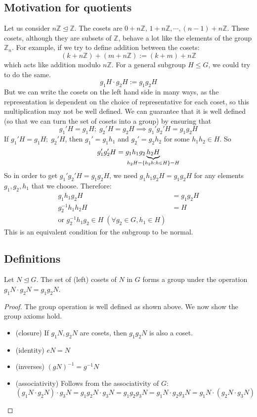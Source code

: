 \subsection{Motivation for quotients}
Let us consider \(n\mathbb Z \trianglelefteq \mathbb Z\).
The cosets are \(0+n\mathbb Z\), \(1 + n\mathbb Z, \cdots, (n-1) + n\mathbb Z\).
These cosets, although they are subsets of \(\mathbb Z\), behave a lot like the elements of the group \(\mathbb Z_n\).
For example, if we try to define addition between the cosets:
\[
	(k + n \mathbb Z) + (m + n \mathbb Z) := (k+m) + n \mathbb Z
\]
which acts like addition modulo \(n\mathbb Z\).
For a general subgroup \(H \leq G\), we could try to do the same.
\[
	g_1 H \cdot g_2 H := g_1 g_2 H
\]
But we can write the cosets on the left hand side in many ways, as the representation is dependent on the choice of representative for each coset, so this multiplication may not be well defined.
We can guarantee that it is well defined (so that we can turn the set of cosets into a group) by ensuring that
\[
	g_1' H = g_1 H;\; g_2' H = g_2 H \implies g_1'g_2'H = g_1g_2H
\]
If \(g_1' H = g_1 H;\; g_2' H\), then \(g_1' = g_1h_1\) and \(g_2' = g_2h_2\) for some \(h_1 h_2 \in H\).
So
\[
	g_1'g_2'H = g_1h_1g_2\underbrace{h_2H}_{\mathclap{h_2H = \{ h_2h : h \in H \} = H}}
\]
So in order to get \(g_1' g_2' H = g_1 g_2 H\), we need \(g_1 h_1 g_2 H = g_1 g_2 H\) for any elements \(g_1, g_2, h_1\) that we choose.
Therefore:
\begin{align*}
	g_1h_1g_2H         & = g_1g_2 H \\
	g_2^{-1} h_1 h_2 H & = H        \\
	\text{or } g_2^{-1} h_1 g_2 \in H\;(\forall g_2 \in G, h_1 \in H)
\end{align*}
This is an equivalent condition for the subgroup to be normal.

\subsection{Definitions}
\begin{proposition}
	Let \(N \trianglelefteq G\).
	The set of (left) cosets of \(N\) in \(G\) forms a group under the operation \(g_1N\cdot g_2N = g_1g_2N\).
\end{proposition}
\begin{proof}
	The group operation is well defined as shown above.
	We now show the group axioms hold.
	\begin{itemize}
		\item (closure) If \(g_1N, g_2N\) are cosets, then \(g_1g_2N\) is also a coset.
		\item (identity) \(eN = N\)
		\item (inverses) \((gN)^{-1} = g^{-1}N\)
		\item (associativity) Follows from the associativity of \(G\): \((g_1 N \cdot g_2 N)\cdot g_3 N = g_1g_2 N \cdot g_3 N = g_1g_2g_3 N = g_1 N \cdot g_2g_3 N = g_1 N \cdot (g_2 N \cdot g_3 N)\)
	\end{itemize}
\end{proof}

